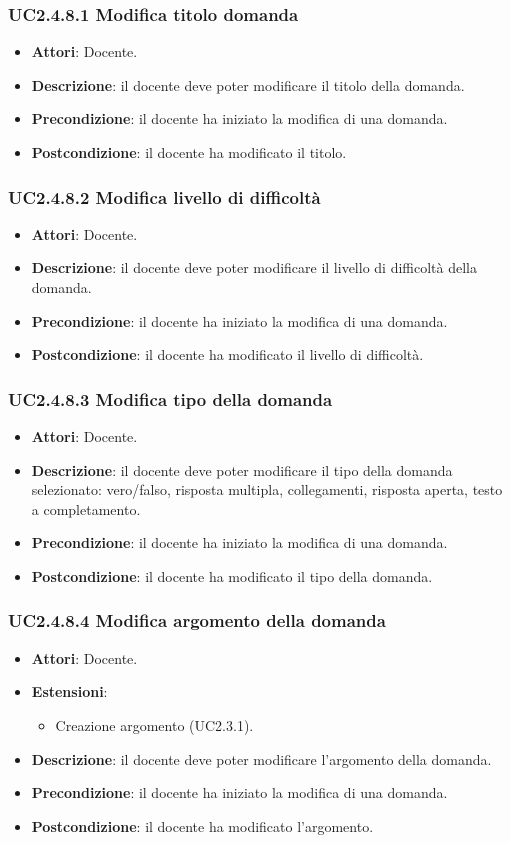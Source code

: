 \subsubsection{UC2.4.8.1 Modifica titolo domanda}
\begin{itemize}
\item \textbf{Attori}: Docente.
\item \textbf{Descrizione}: il docente deve poter modificare il titolo della domanda.
\item \textbf{Precondizione}: il docente ha iniziato la modifica di una domanda.
\item \textbf{Postcondizione}: il docente ha modificato il titolo.
\end{itemize}
\subsubsection{UC2.4.8.2 Modifica livello di difficoltà }
\begin{itemize}
\item \textbf{Attori}: Docente.
\item \textbf{Descrizione}: il docente deve poter modificare il livello di difficoltà della domanda.
\item \textbf{Precondizione}: il docente ha iniziato la modifica di una domanda.
\item \textbf{Postcondizione}: il docente ha modificato il livello di difficoltà.
\end{itemize}
\subsubsection{UC2.4.8.3 Modifica tipo della domanda}
\begin{itemize}
\item \textbf{Attori}: Docente.
\item \textbf{Descrizione}: il docente deve poter modificare il tipo della domanda selezionato: vero/falso, risposta multipla, collegamenti, risposta aperta, testo a completamento.
\item \textbf{Precondizione}: il docente ha iniziato la modifica di una domanda.
\item \textbf{Postcondizione}: il docente ha modificato il tipo della domanda.
\end{itemize}
\subsubsection{UC2.4.8.4 Modifica argomento della domanda}
\begin{itemize}
\item \textbf{Attori}: Docente.
\item \textbf{Estensioni}:
\begin{itemize}
\item Creazione argomento (UC2.3.1).
\end{itemize}
\item \textbf{Descrizione}: il docente deve poter modificare l'argomento della domanda.
\item \textbf{Precondizione}: il docente ha iniziato la modifica di una domanda.
\item \textbf{Postcondizione}: il docente ha modificato l'argomento.
\end{itemize}
